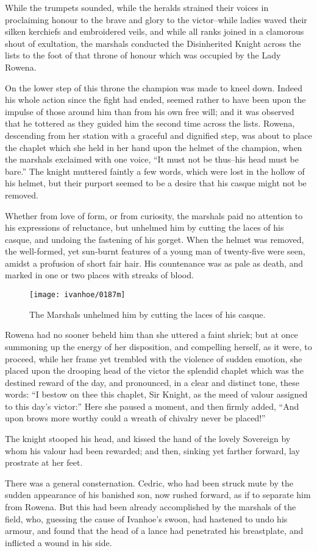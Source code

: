 While the trumpets sounded, while the heralds strained their voices in
proclaiming honour to the brave and glory to the victor--while ladies
waved their silken kerchiefs and embroidered veils, and while all ranks
joined in a clamorous shout of exultation, the marshals conducted the
Disinherited Knight across the lists to the foot of that throne of
honour which was occupied by the Lady Rowena.

On the lower step of this throne the champion was made to kneel down.
Indeed his whole action since the fight had ended, seemed rather to have
been upon the impulse of those around him than from his own free will;
and it was observed that he tottered as they guided him the second time
across the lists. Rowena, descending from her station with a graceful
and dignified step, was about to place the chaplet which she held in her
hand upon the helmet of the champion, when the marshals exclaimed with
one voice, ``It must not be thus--his head must be bare.'' The knight
muttered faintly a few words, which were lost in the hollow of his
helmet, but their purport seemed to be a desire that his casque might
not be removed.

Whether from love of form, or from curiosity, the marshals paid no
attention to his expressions of reluctance, but unhelmed him by cutting
the laces of his casque, and undoing the fastening of his gorget. When
the helmet was removed, the well-formed, yet sun-burnt features of a
young man of twenty-five were seen, amidst a profusion of short fair
hair. His countenance was as pale as death, and marked in one or two
places with streaks of blood.

\begin{figure}
    \centering
    \texttt{[image: ivanhoe/0187m]}
    \caption{The Marshals unhelmed him by cutting the laces of his casque.}
\end{figure}

Rowena had no sooner beheld him than she uttered a faint shriek; but at
once summoning up the energy of her disposition, and compelling herself,
as it were, to proceed, while her frame yet trembled with the violence
of sudden emotion, she placed upon the drooping head of the victor the
splendid chaplet which was the destined reward of the day, and
pronounced, in a clear and distinct tone, these words: ``I bestow on
thee this chaplet, Sir Knight, as the meed of valour assigned to this
day's victor:'' Here she paused a moment, and then firmly added, ``And
upon brows more worthy could a wreath of chivalry never be placed!''

The knight stooped his head, and kissed the hand of the lovely Sovereign
by whom his valour had been rewarded; and then, sinking yet farther
forward, lay prostrate at her feet.

There was a general consternation. Cedric, who had been struck mute by
the sudden appearance of his banished son, now rushed forward, as if to
separate him from Rowena. But this had been already accomplished by the
marshals of the field, who, guessing the cause of Ivanhoe's swoon, had
hastened to undo his armour, and found that the head of a lance had
penetrated his breastplate, and inflicted a wound in his side.
